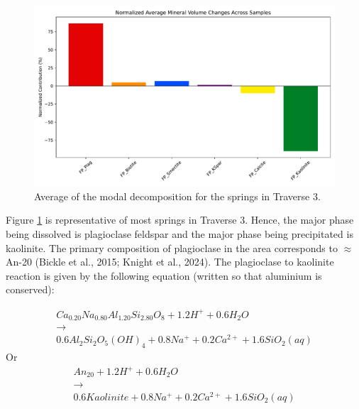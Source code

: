 \begin{figure}[h]
    \centering
    \includegraphics[width=\textwidth]{Stoich.pdf}
    \caption{Average of the modal decomposition for the springs in Traverse 3.}
    \label{fig:discussion6}
\end{figure}

\FloatBarrier

Figure \ref{fig:discussion6} is representative of most springs in Traverse 3. Hence, the major phase being dissolved is plagioclase feldspar and the major phase being precipitated is kaolinite. The primary composition of plagioclase in the area corresponds to $\approx$ An-20 (Bickle et al., 2015; Knight et al., 2024).  The plagioclase to kaolinite reaction is given by the following equation (written so that aluminium is conserved):

\begin{equation}
    \begin{matrix}
Ca_{0.20}Na_{0.80}Al_{1.20}Si_{2.80}O_{8} + 1.2H^{+} + 0.6 H_{2}O \\ \rightarrow\\ 0.6 Al_{2}Si_{2}O_{5}(OH)_{4} + 0.8 Na^{+} + 0.2 Ca^{2+} + 1.6 SiO_{2}(aq)
    \end{matrix}
\end{equation}
\quad Or
\begin{equation}
    \begin{matrix}
An_{20} + 1.2 H^{+} + 0.6 H_{2}O\\ \rightarrow\\ 0.6 Kaolinite + 0.8 Na^{+} + 0.2 Ca^{2+} + 1.6 SiO_{2}(aq)
\end{matrix}
\label{eq:10}
\end{equation}\\


